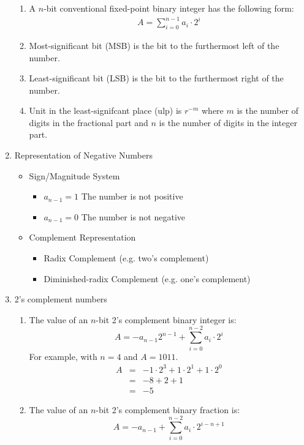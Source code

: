 \documentclass[times, twocolumn, 10pt]{article}
\begin{document}
\begin{enumerate}
  \begin{enumerate}
  \item A $n$-bit conventional fixed-point binary integer has the
    following form:
    \begin{eqnarray*}
      A = \sum_{i=0}^{n-1} a_{i} \cdot 2^{i} 
    \end{eqnarray*}
  \item Most-significant bit (MSB) is the bit to the furthermost left of
    the number.
  \item Least-significant bit (LSB) is the bit to the furthermost right
    of the number.
  \item Unit in the least-signifcant place (ulp) is $r^{-m}$ where $m$
    is the number of digits in the fractional part and $n$ is the number
    of digits in the integer part.
  \end{enumerate}
\item Representation of Negative Numbers
  \begin{itemize}
  \item Sign/Magnitude System
    \begin{itemize}
    \item $a_{n-1}=1$ The number is not positive
    \item $a_{n-1}=0$ The number is not negative
    \end{itemize}
  \item Complement Representation
    \begin{itemize}
    \item Radix Complement (e.g. two's complement)
    \item Diminished-radix Complement (e.g. one's complement)
    \end{itemize}
\end{itemize}
\item 2's complement numbers
  \begin{enumerate}
  \item The value of an $n$-bit 2's complement binary integer is: 
    \[ A = -a_{n-1}2^{n-1} + \sum_{i=0}^{n-2} a_{i} \cdot 2^{i} \]
    For example, with $n = 4$ and $A = 1011.$
    \begin{eqnarray*}
      A  & = & -1 \cdot 2^{3} + 1 \cdot 2^{1} + 1 \cdot 2^{0} \\
      & = & -8 + 2+ 1 \\
      & = & -5
    \end{eqnarray*}
  \item The value of an $n$-bit 2's complement binary fraction is:
    \[ A = -a_{n-1} + \sum_{i=0}^{n-2} a_{i} \cdot 2^{i - n + 1} \]

\end{enumerate}
\end{enumerate}
\end{document}
